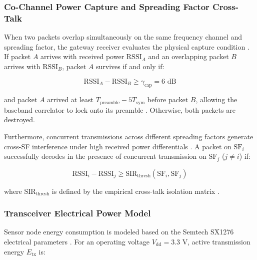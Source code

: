 \documentclass[preprint,review,12pt]{elsarticle}
\begin{document}
\subsubsection{Co-Channel Power Capture and Spreading Factor Cross-Talk}

When two packets overlap simultaneously on the same frequency channel and spreading factor, the gateway receiver evaluates the physical capture condition \cite{bankov2017mathematical}. If packet $A$ arrives with received power $\text{RSSI}_A$ and an overlapping packet $B$ arrives with $\text{RSSI}_B$, packet $A$ survives if and only if:

\begin{equation}

\label{eq:capture}

\text{RSSI}_A - \text{RSSI}_B \ge \gamma_{\text{cap}} = 6\text{ dB}

\end{equation}

and packet $A$ arrived at least $T_{\text{preamble}} - 5 T_{\text{sym}}$ before packet $B$, allowing the baseband correlator to lock onto its preamble \cite{semtech2020sx1276}. Otherwise, both packets are destroyed.

Furthermore, concurrent transmissions across different spreading factors generate cross-SF interference under high received power differentials \cite{croce2018impact}. A packet on $\text{SF}_i$ successfully decodes in the presence of concurrent transmission on $\text{SF}_j$ ($j \ne i$) if:

\begin{equation}

\label{eq:cross_sf}

\text{RSSI}_i - \text{RSSI}_j \ge \text{SIR}_{\text{thresh}}(\text{SF}_i, \text{SF}_j)

\end{equation}

where $\text{SIR}_{\text{thresh}}$ is defined by the empirical cross-talk isolation matrix \cite{croce2018impact}.

\subsubsection{Transceiver Electrical Power Model}

Sensor node energy consumption is modeled based on the Semtech SX1276 electrical parameters \cite{semtech2020sx1276}. For an operating voltage $V_{\text{dd}} = 3.3\text{ V}$, active transmission energy $E_{\text{tx}}$ is:
\end{document}
